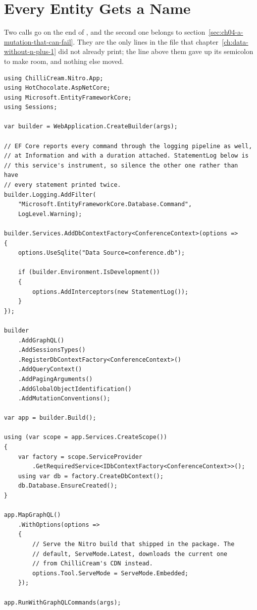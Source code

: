 \section{Every Entity Gets a Name}
\label{sec:ch04-every-entity-gets-a-name}

%
Two calls go on the end of , and the second one belongs to
section~\ref{sec:ch04-a-mutation-that-can-fail}. They are the only lines in
the file that chapter~\ref{ch:data-without-n-plus-1} did not already print;
the line above them gave up its semicolon to make room, and nothing else
moved.

\begin{verbatim}
using ChilliCream.Nitro.App;
using HotChocolate.AspNetCore;
using Microsoft.EntityFrameworkCore;
using Sessions;

var builder = WebApplication.CreateBuilder(args);

// EF Core reports every command through the logging pipeline as well,
// at Information and with a duration attached. StatementLog below is
// this service's instrument, so silence the other one rather than have
// every statement printed twice.
builder.Logging.AddFilter(
    "Microsoft.EntityFrameworkCore.Database.Command",
    LogLevel.Warning);

builder.Services.AddDbContextFactory<ConferenceContext>(options =>
{
    options.UseSqlite("Data Source=conference.db");

    if (builder.Environment.IsDevelopment())
    {
        options.AddInterceptors(new StatementLog());
    }
});

builder
    .AddGraphQL()
    .AddSessionsTypes()
    .RegisterDbContextFactory<ConferenceContext>()
    .AddQueryContext()
    .AddPagingArguments()
    .AddGlobalObjectIdentification()
    .AddMutationConventions();

var app = builder.Build();

using (var scope = app.Services.CreateScope())
{
    var factory = scope.ServiceProvider
        .GetRequiredService<IDbContextFactory<ConferenceContext>>();
    using var db = factory.CreateDbContext();
    db.Database.EnsureCreated();
}

app.MapGraphQL()
    .WithOptions(options =>
    {
        // Serve the Nitro build that shipped in the package. The
        // default, ServeMode.Latest, downloads the current one
        // from ChilliCream's CDN instead.
        options.Tool.ServeMode = ServeMode.Embedded;
    });

app.RunWithGraphQLCommands(args);
\end{verbatim}

